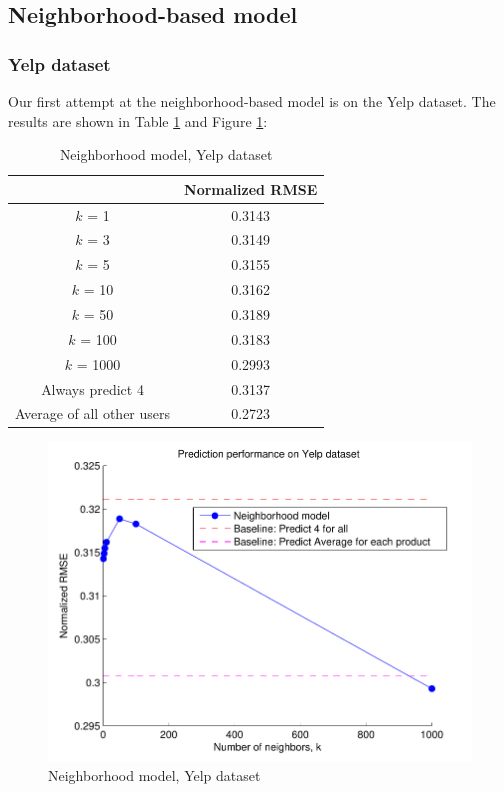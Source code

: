 \documentclass[letterpaper, 11 pt, conference]{ieeeconf}
\begin{document}
\subsection{Neighborhood-based model}

\subsubsection{Yelp dataset}
Our first attempt at the neighborhood-based model is on the Yelp dataset. The 
results are shown in Table \ref{table:modelone_yelp} and Figure 
\ref{fig:modelone_yelp}:

\begin{table}[htb]
\centering
\begin{tabular}{|c|c|}
\cline{2-2}

\multicolumn{1}{c|}{}  & {Normalized RMSE} \tabularnewline \hline
$k$ = 1 & 0.3143  \tabularnewline
$k$ = 3 &  0.3149 \tabularnewline
$k$ = 5 & 0.3155  \tabularnewline
$k$ = 10 & 0.3162  \tabularnewline
$k$ = 50  & 0.3189 \tabularnewline
$k$ = 100 & 0.3183 \tabularnewline
$k$ = 1000 & 0.2993 \tabularnewline
\hline
Always predict 4 & 0.3137 \tabularnewline 
Average of all other users & 0.2723 \tabularnewline

\hline
\end{tabular}
\caption{Neighborhood model, Yelp dataset}
\label{table:modelone_yelp}
\end{table}

\begin{figure}[h]
\includegraphics[scale=0.6]{images/modelone_yelp.pdf}
\caption{Neighborhood model, Yelp dataset}
\label{fig:modelone_yelp}
\end{figure}
\end{document}

